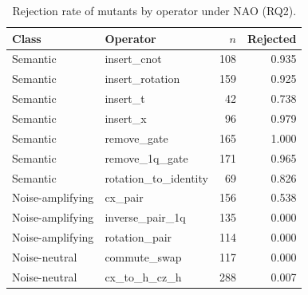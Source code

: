 \begin{table}[t]
\centering
\caption{Rejection rate of mutants by operator under NAO (RQ2).}
\label{tab:app-operator}
\small
\begin{tabular}{llrr}
\toprule
Class & Operator & $n$ & Rejected \\
\midrule
Semantic & insert\_cnot & 108 & 0.935 \\
Semantic & insert\_rotation & 159 & 0.925 \\
Semantic & insert\_t & 42 & 0.738 \\
Semantic & insert\_x & 96 & 0.979 \\
Semantic & remove\_gate & 165 & 1.000 \\
Semantic & remove\_1q\_gate & 171 & 0.965 \\
Semantic & rotation\_to\_identity & 69 & 0.826 \\
Noise-amplifying & cx\_pair & 156 & 0.538 \\
Noise-amplifying & inverse\_pair\_1q & 135 & 0.000 \\
Noise-amplifying & rotation\_pair & 114 & 0.000 \\
Noise-neutral & commute\_swap & 117 & 0.000 \\
Noise-neutral & cx\_to\_h\_cz\_h & 288 & 0.007 \\
\bottomrule
\end{tabular}
\end{table}
